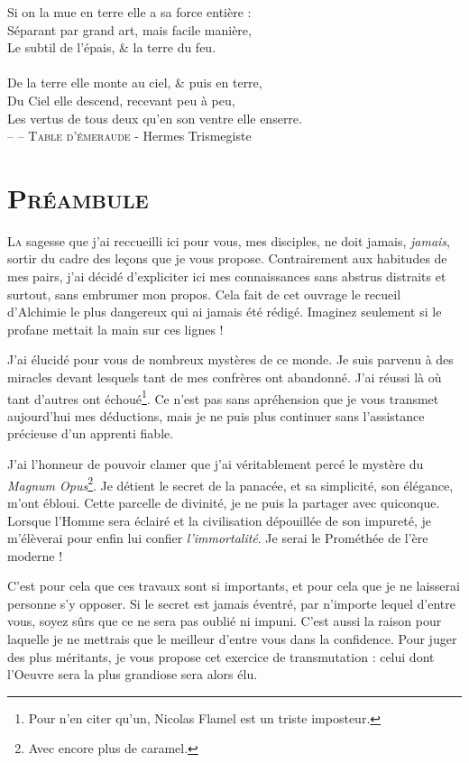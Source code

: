 \noindent
Si on la mue en terre elle a sa force entière :\\
Séparant par grand art, mais facile manière,\\
Le subtil de l'épais, \& la terre du feu.\\
\\
De la terre elle monte au ciel, \& puis en terre,\\
Du Ciel elle descend, recevant peu à peu,\\
Les vertus de tous deux qu'en son ventre elle enserre.\\

\small{-- -- \textsc{Table d'émeraude} - Hermes Trismegiste}

\newpage

\section{\textsc{Préambule}}

\lettrine{L}{a} sagesse que j'ai reccueilli ici pour vous, mes disciples, ne doit jamais,
\emph{jamais}, sortir du cadre des leçons que je vous propose.
Contrairement aux habitudes de mes pairs, j'ai décidé d'expliciter ici mes
connaissances sans abstrus distraits et surtout, sans embrumer mon
propos. Cela fait de cet ouvrage le recueil d'Alchimie le plus dangereux qui
ai jamais été rédigé. Imaginez seulement si le profane mettait la main sur ces
lignes !

J'ai élucidé pour vous de nombreux mystères de ce monde. Je suis parvenu à des
miracles devant lesquels tant de mes confrères ont abandonné. J'ai réussi là où
tant d'autres ont échoué\footnote{Pour n'en citer qu'un, Nicolas Flamel est un
triste imposteur.}. Ce n'est pas
sans apréhension que je vous transmet aujourd'hui mes déductions, mais je ne puis
plus continuer sans l'assistance précieuse d'un apprenti fiable.

J'ai l'honneur de pouvoir clamer que j'ai véritablement percé le mystère du
\emph{Magnum Opus}\footnote{Avec encore plus de caramel.}. Je détient le secret de la panacée, et sa simplicité, son
élégance, m'ont ébloui. Cette parcelle de divinité, je ne puis la partager avec
quiconque. Lorsque l'Homme sera éclairé et la civilisation dépouillée de son
impureté, je m'élèverai pour enfin lui confier \emph{l'immortalité}. Je serai
le Prométhée de l'ère moderne !

C'est pour cela que ces travaux sont si importants, et pour cela que je ne
laisserai personne s'y opposer. Si le secret est jamais éventré, par n'importe
lequel d'entre vous, soyez sûrs que ce ne sera pas oublié ni impuni. C'est
aussi la raison pour laquelle je ne mettrais que le meilleur d'entre vous dans
la confidence. Pour juger des plus méritants, je vous propose cet exercice de
transmutation : celui dont l'Oeuvre sera la plus grandiose sera alors élu. %

